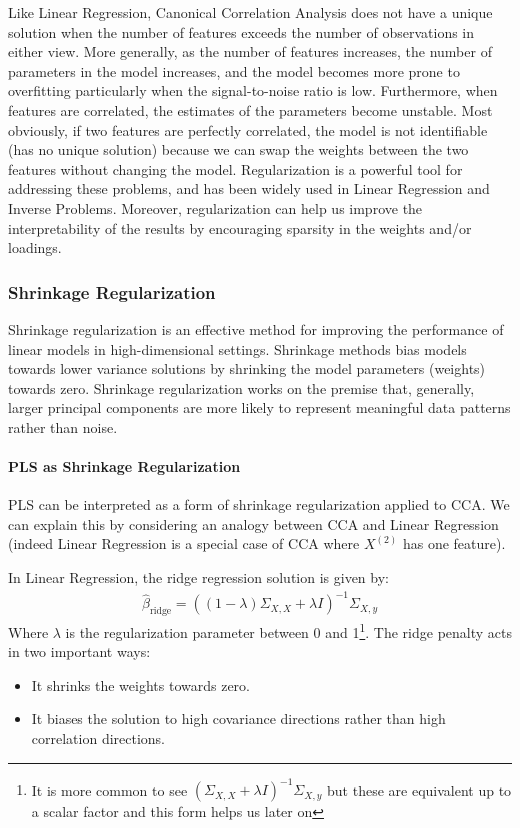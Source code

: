 Like Linear Regression, Canonical Correlation Analysis does not have a unique solution when the number of features exceeds the number of observations in either view.
More generally, as the number of features increases, the number of parameters in the model increases, and the model becomes more prone to overfitting particularly when the signal-to-noise ratio is low.
Furthermore, when features are correlated, the estimates of the parameters become unstable.
Most obviously, if two features are perfectly correlated, the model is not identifiable (has no unique solution) because we can swap the weights between the two features without changing the model.
Regularization is a powerful tool for addressing these problems, and has been widely used in Linear Regression and Inverse Problems.
Moreover, regularization can help us improve the interpretability of the results by encouraging sparsity in the weights and/or loadings.

\subsubsection{Shrinkage Regularization}

Shrinkage regularization is an effective method for improving the performance of linear models in high-dimensional settings.
Shrinkage methods bias models towards lower variance solutions by shrinking the model parameters (weights) towards zero.
Shrinkage regularization works on the premise that, generally, larger principal components are more likely to represent meaningful data patterns rather than noise.

\paragraph{PLS as Shrinkage Regularization}

PLS can be interpreted as a form of shrinkage regularization applied to CCA. We can explain this by considering an analogy between CCA and Linear Regression (indeed Linear Regression is a special case of CCA where \(X^{(2)}\) has one feature).

In Linear Regression, the ridge regression solution is given by:
\begin{align}
    \hat{\beta}_{\text{ridge}} = ((1-\lambda)\Sigma_{X,X} + \lambda I)^{-1} \Sigma_{X,y}
\end{align}
Where \(\lambda\) is the regularization parameter between 0 and 1\footnote{It is more common to see $(\Sigma_{X,X} + \lambda I)^{-1} \Sigma_{X,y}$ but these are equivalent up to a scalar factor and this form helps us later on}.
The ridge penalty acts in two important ways:
\begin{itemize}
    \item It shrinks the weights towards zero.
    \item It biases the solution to high covariance directions rather than high correlation directions.
\end{itemize}

